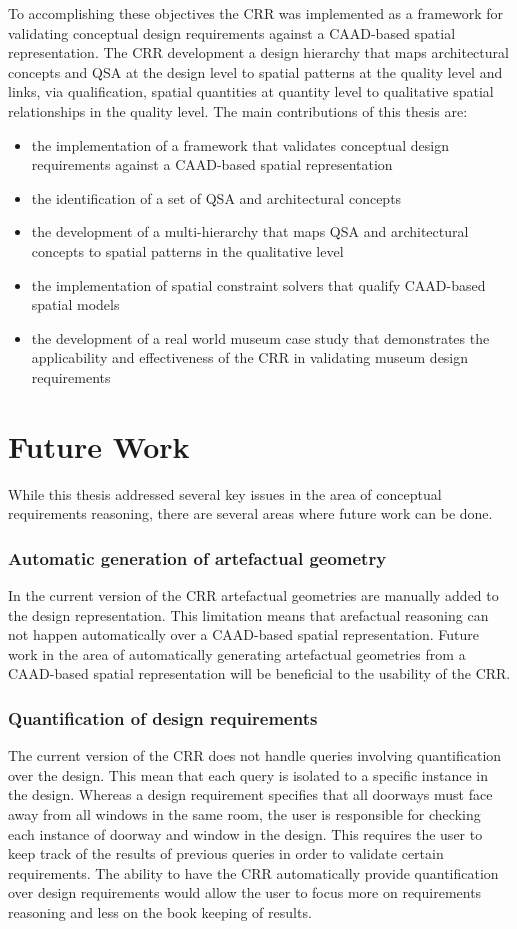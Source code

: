\documentclass[12pt]{ucthesis}
\begin{document}
To accomplishing these objectives the CRR was implemented as a framework for validating conceptual design requirements against a CAAD-based spatial representation. The CRR development a design hierarchy that maps architectural concepts and QSA at the design level to spatial patterns at the quality level and links, via qualification, spatial quantities at quantity level to qualitative spatial relationships in the quality level. The main contributions of this thesis are:
\begin{itemize}
\item the implementation of a framework that validates conceptual design requirements against a CAAD-based spatial representation
\item the identification of a set of QSA and architectural concepts
\item the development of a multi-hierarchy that maps QSA and architectural concepts to spatial patterns in the qualitative level
\item the implementation of spatial constraint solvers that qualify CAAD-based spatial models
\item the development of a real world museum case study that demonstrates the applicability and effectiveness of the CRR in validating museum design requirements
\end{itemize}

\section{Future Work}
While this thesis addressed several key issues in the area of conceptual requirements reasoning, there are several areas where future work can be done. 

\subsubsection{Automatic generation of artefactual geometry}
In the current version of the CRR artefactual geometries are manually added to the design representation. This limitation means that arefactual reasoning can not happen automatically over a CAAD-based spatial representation. Future work in the area of automatically generating artefactual geometries from a CAAD-based spatial representation will be beneficial to the usability of the CRR.

\subsubsection{Quantification of design requirements}
The current version of the CRR does not handle queries involving quantification over the design. This mean that each query is isolated to a specific instance in the design. Whereas a design requirement specifies that all doorways must face away from all windows in the same room, the user is responsible for checking each instance of doorway and window in the design. This requires the user to keep track of the results of previous queries in order to validate certain requirements. The ability to have the CRR automatically provide quantification over design requirements would allow the user to focus more on requirements reasoning and less on the book keeping of results.
\end{document}
